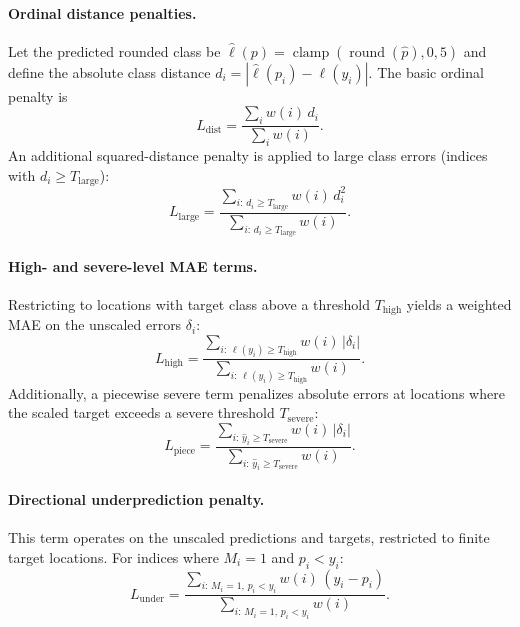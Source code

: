 \documentclass[11pt, a4paper]{article}
\begin{document}
\paragraph{Ordinal distance penalties.} Let the predicted rounded class be $\hat\ell(p)=\operatorname{clamp}(\operatorname{round}(\hat p),0,5)$ and define the absolute class distance $d_i=|\hat\ell(p_i)-\ell(y_i)|$. The basic ordinal penalty is
\begin{equation}
L_{\mathrm{dist}} = \frac{\sum_i w(i)\, d_i}{\sum_i w(i)}.
\end{equation}
An additional squared-distance penalty is applied to large class errors (indices with $d_i\ge T_{\mathrm{large}}$):
\begin{equation}
L_{\mathrm{large}} = \frac{\sum_{i:\,d_i\ge T_{\mathrm{large}}} w(i)\, d_i^2}{\sum_{i:\,d_i\ge T_{\mathrm{large}}} w(i)}.
\end{equation}

\paragraph{High- and severe-level MAE terms.} Restricting to locations with target class above a threshold $T_{\mathrm{high}}$ yields a weighted MAE on the unscaled errors $\delta_i$:
\begin{equation}
L_{\mathrm{high}} = \frac{\sum_{i:\,\ell(y_i)\ge T_{\mathrm{high}}} w(i)\,|\delta_i|}{\sum_{i:\,\ell(y_i)\ge T_{\mathrm{high}}} w(i)}.
\end{equation}
Additionally, a piecewise severe term penalizes absolute errors at locations where the scaled target exceeds a severe threshold $T_{\mathrm{severe}}$:
\begin{equation}
L_{\mathrm{piece}} = \frac{\sum_{i:\,\hat y_i\ge T_{\mathrm{severe}}} w(i)\,|\delta_i|}{\sum_{i:\,\hat y_i\ge T_{\mathrm{severe}}} w(i)}.
\end{equation}

\paragraph{Directional underprediction penalty.} This term operates on the unscaled predictions and targets, restricted to finite target locations. For indices where $M_i=1$ and $p_i<y_i$:
\begin{equation}
L_{\mathrm{under}} = \frac{\sum_{i:\,M_i=1,\,p_i<y_i} w(i)\,(y_i-p_i)}{\sum_{i:\,M_i=1,\,p_i<y_i} w(i)}.
\end{equation}
\end{document}
